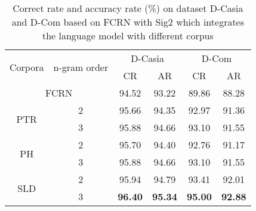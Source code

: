\documentclass[10pt,conference,a4paper]{IEEEtran}
\begin{document}
%
%

\begin{table}[t]
\caption{Correct rate and accuracy rate (\%) on dataset D-Casia and D-Com based on FCRN with Sig2 which integrates the language model with different corpus}
\label{TableCoporaResult}
\centering
\begin{tabular}{cc|cc|cc}
\hline
\multirow{2}{*}{Corpora}&\multirow{2}{*}{n-gram order}&\multicolumn{2}{c|}{D-Casia}&\multicolumn{2}{c}{D-Com}\\
\cline{3-6}
&&CR&AR&CR&AR\\

\hline
\multicolumn{2}{c|}{FCRN}&94.52&93.22&89.86&88.28\\
\hline
\multirow{2}{*}{PTR}&2&95.66&94.35&92.97&91.36\\
&3&95.88&94.66&93.10&91.55\\
\hline
\multirow{2}{*}{PH}&2&95.70&94.40&92.76&91.17\\
&3&95.88&94.66&93.10&91.55\\
\hline
\multirow{2}{*}{SLD}&2&95.94&94.79&93.41&92.01\\
&3&\textbf{96.40}&\textbf{95.34}&\textbf{95.00}&\textbf{92.88}\\

\hline
\end{tabular}
\end{table}
\end{document}
